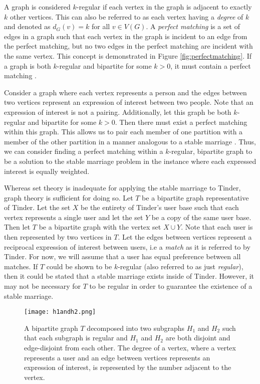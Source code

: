 A graph is considered $k$-regular if each vertex in the graph is adjacent to exactly $k$ other vertices. This can also be referred to as each vertex having a \textit{degree} of $k$ and denoted as $d_{G}(v) = k$ for all $v \in V(G)$. A \textit{perfect matching} is a set of edges in a graph such that each vertex in the graph is incident to an edge from the perfect matching, but no two edges in the perfect matching are incident with the same vertex. This concept is demonstrated in Figure \ref{fig:perfectmatching}. If a graph is both $k$-regular and bipartite for some $k > 0$, it must contain a perfect matching \citep{Bondy1976}.

Consider a graph where each vertex represents a person and the edges between two vertices represent an expression of interest between two people. Note that an expression of interest is not a pairing. Additionally, let this graph be both $k$-regular and bipartite for some $k > 0$. Then there must exist a perfect matching within this graph. This allows us to pair each member of one partition with a member of the other partition in a manner analogous to a stable marriage \citep{Bondy1976}. Thus, we can consider finding a perfect matching within a $k$-regular, bipartite graph to be a solution to the stable marriage problem in the instance where each expressed interest is equally weighted.

Whereas set theory is inadequate for applying the stable marriage to Tinder, graph theory is sufficient for doing so. Let $T$ be a bipartite graph representative of Tinder. Let the set $X$ be the entirety of Tinder's user base such that each vertex represents a single user and let the set $Y$ be a copy of the same user base. Then let $T$ be a bipartite graph with the vertex set $X \cup Y$. Note that each user is then represented by two vertices in $T$. Let the edges between vertices represent a reciprocal expression of interest between users, i.e a \textit{match} as it is referred to by Tinder. For now, we will assume that a user has equal preference between all matches. If $T$ could be shown to be $k$-regular (also referred to as just \textit{regular}), then it could be stated that a stable marriage exists inside of Tinder. However, it may not be necessary for $T$ to be regular in order to guarantee the existence of a stable marriage.

\begin{figure}[t]
    \centering
    \texttt{[image: h1andh2.png]}
    \caption{A bipartite graph $T$ decomposed into two subgraphs $H_{1}$ and $H_{2}$ such that each subgraph is regular and $H_{1}$ and $H_{2}$ are both disjoint and edge-disjoint from each other. The degree of a vertex, where a vertex represents a user and an edge between vertices represents an expression of interest, is represented by the number adjacent to the vertex.}
    \label{fig:h1andh2}
\end{figure}

